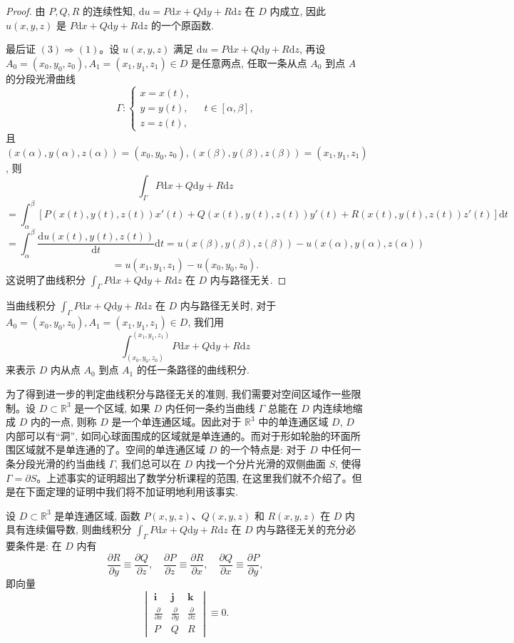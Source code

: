 \begin{proof}
由 $P,Q,R$ 的连续性知, $\mathrm du=P\mathrm dx+Q\mathrm dy+R\mathrm dz$ 在 $D$ 内成立, 因此 $u(x,y,z)$ 是 $P\mathrm dx+Q\mathrm dy+R\mathrm dz$ 的一个原函数.

最后证 $(3)\Rightarrow(1)$。设 $u(x,y,z)$ 满足 $\mathrm du=P\mathrm dx+Q\mathrm dy+R\mathrm dz$, 再设 $A_0=(x_0,y_0,z_0),A_1=(x_1,y_1,z_1)\in D$ 是任意两点, 任取一条从点 $A_0$ 到点 $A$ 的分段光滑曲线
\[
  \Gamma:\begin{cases}
    x=x(t),\\
    y=y(t),\\
    z=z(t),
  \end{cases}\quad t\in[\alpha,\beta],
\]
且 $(x(\alpha),y(\alpha),z(\alpha))=(x_0,y_0,z_0),(x(\beta),y(\beta),z(\beta))=(x_1,y_1,z_1)$, 则
\[
  \int_\Gamma P\mathrm dx+Q\mathrm dy+R\mathrm dz
\]
\[
  =\int_\alpha^\beta
  [P(x(t),y(t),z(t))x'(t)+Q(x(t),y(t),z(t))y'(t)
  +R(x(t),y(t),z(t))z'(t)]\mathrm dt
\]
\[
  =\int_\alpha^\beta\frac{\mathrm du(x(t),y(t),z(t))}{\mathrm dt}\mathrm dt
  =u(x(\beta),y(\beta),z(\beta))-u(x(\alpha),y(\alpha),z(\alpha))
\]
\[
  =u(x_1,y_1,z_1)-u(x_0,y_0,z_0).
\]
这说明了曲线积分 $\int_\Gamma P\mathrm dx+Q\mathrm dy+R\mathrm dz$ 在 $D$ 内与路径无关.
\end{proof}


当曲线积分 $\int_\Gamma P\mathrm dx+Q\mathrm dy+R\mathrm dz$ 在 $D$ 内与路径无关时, 对于 $A_0=(x_0,y_0,z_0),A_1=(x_1,y_1,z_1)\in D$, 我们用
\[
  \int_{(x_0,y_0,z_0)}^{(x_1,y_1,z_1)}P\mathrm dx+Q\mathrm dy+R\mathrm dz
\]
来表示 $D$ 内从点 $A_0$ 到点 $A_1$ 的任一条路径的曲线积分.

为了得到进一步的判定曲线积分与路径无关的准则, 我们需要对空间区域作一些限制。设 $D\subset\mathbb R^3$ 是一个区域, 如果 $D$ 内任何一条约当曲线 $\Gamma$ 总能在 $D$ 内连续地缩成 $D$ 内的一点, 则称 $D$ 是一个单连通区域。因此对于 $\mathbb R^3$ 中的单连通区域 $D$, $D$ 内部可以有“洞”, 如同心球面围成的区域就是单连通的。而对于形如轮胎的环面所围区域就不是单连通的了。空间的单连通区域 $D$ 的一个特点是: 对于 $D$ 中任何一条分段光滑的约当曲线 $\Gamma$, 我们总可以在 $D$ 内找一个分片光滑的双侧曲面 $S$, 使得 $\Gamma=\partial S$。上述事实的证明超出了数学分析课程的范围, 在这里我们就不介绍了。但是在下面定理的证明中我们将不加证明地利用该事实.

\begin{theorem}\label{theorem:ma-16-7-2}
设 $D\subset\mathbb R^3$ 是单连通区域, 函数 $P(x,y,z)$、$Q(x,y,z)$ 和 $R(x,y,z)$ 在 $D$ 内具有连续偏导数, 则曲线积分 $\int_\Gamma P\mathrm dx+Q\mathrm dy+R\mathrm dz$ 在 $D$ 内与路径无关的充分必要条件是: 在 $D$ 内有
\[
  \frac{\partial R}{\partial y}\equiv\frac{\partial Q}{\partial z},
  \quad
  \frac{\partial P}{\partial z}\equiv\frac{\partial R}{\partial x},
  \quad
  \frac{\partial Q}{\partial x}\equiv\frac{\partial P}{\partial y},
\]
即向量
\[
  \begin{vmatrix}
    \boldsymbol i&\boldsymbol j&\boldsymbol k\\
    \frac{\partial}{\partial x}&\frac{\partial}{\partial y}&\frac{\partial}{\partial z}\\
    P&Q&R
  \end{vmatrix}
  \equiv0.
\]
\end{theorem}



